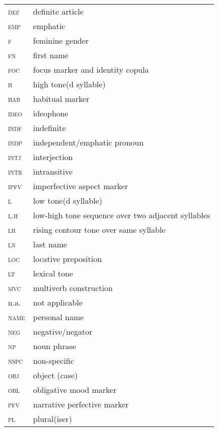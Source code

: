 \begin{tabularx}{.45\textwidth}{lQ}
 \textsc{def} & definite article \\
 \textsc{emp} & emphatic \\
 \textsc{f} & feminine gender \\
 \textsc{fn} & first name \\
 \textsc{foc} & focus marker and identity copula \\
 \textsc{h} & high tone(d syllable) \\
 \textsc{hab} & habitual marker \\
 \textsc{ideo} & ideophone \\
 \textsc{indf} & indefinite \\
 \textsc{indp} & independent/emphatic pronoun \\
 \textsc{intj} & interjection \\
 \textsc{intr} & intransitive \\
\textsc{ipfv} & imperfective aspect marker \\
 \textsc{l} & low tone(d syllable) \\
 \textsc{l.h} & low-high tone sequence over two adjacent syllables \\
\textsc{lh} & rising contour tone over same syllable\\
\textsc{ln} & last name\\
\textsc{loc} & locative preposition\\
\textsc{lt} & lexical tone\\
\textsc{mvc} & multiverb construction\\
n.a. & not applicable\\
\textsc{name} & personal name\\
\textsc{neg} & negative/negator\\
\textsc{np} & noun phrase\\
\textsc{nspc} & non-specific\\
\textsc{obj} & object (case)\\
\textsc{obl} & obligative mood marker\\
\textsc{pfv} & narrative perfective marker\\
\textsc{pl} & plural(iser)\\
\end{tabularx}

